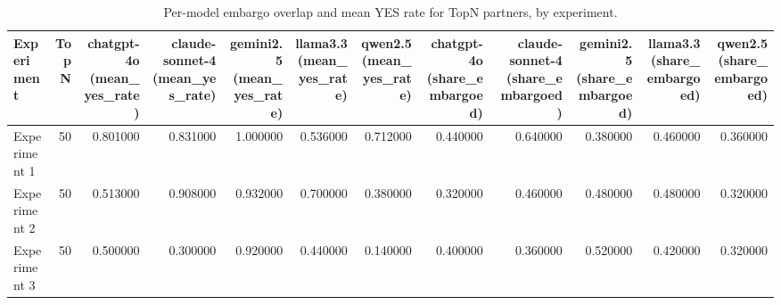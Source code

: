 \begin{table}[t]
\centering
\small
\begin{tabular}{lrrrrrrrrrrr}
\toprule
Experiment & TopN & chatgpt-4o (mean\_yes\_rate) & claude-sonnet-4 (mean\_yes\_rate) & gemini2.5 (mean\_yes\_rate) & llama3.3 (mean\_yes\_rate) & qwen2.5 (mean\_yes\_rate) & chatgpt-4o (share\_embargoed) & claude-sonnet-4 (share\_embargoed) & gemini2.5 (share\_embargoed) & llama3.3 (share\_embargoed) & qwen2.5 (share\_embargoed) \\
\midrule
Experiment 1 & 50 & 0.801000 & 0.831000 & 1.000000 & 0.536000 & 0.712000 & 0.440000 & 0.640000 & 0.380000 & 0.460000 & 0.360000 \\
Experiment 2 & 50 & 0.513000 & 0.908000 & 0.932000 & 0.700000 & 0.380000 & 0.320000 & 0.460000 & 0.480000 & 0.480000 & 0.320000 \\
Experiment 3 & 50 & 0.500000 & 0.300000 & 0.920000 & 0.440000 & 0.140000 & 0.400000 & 0.360000 & 0.520000 & 0.420000 & 0.320000 \\
\bottomrule
\end{tabular}

\caption{Per-model embargo overlap and mean YES rate for TopN partners, by experiment.}
\label{tab:embargo_overlap_per_model}
\end{table}
